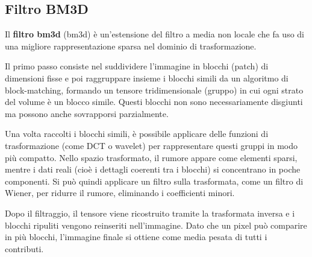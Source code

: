 \documentclass[../main.tex]{subfiles}
\begin{document}
\subsection{Filtro BM3D}

Il \textbf{filtro \acrshort{bm3d}} (\acrlong{bm3d}) è un'estensione del filtro a media non locale che fa uso di una migliore rappresentazione sparsa nel dominio di trasformazione\cite{manjon_2008}.

Il primo passo consiste nel suddividere l'immagine in blocchi (patch) di dimensioni fisse e poi raggruppare insieme i blocchi simili da un algoritmo di block-matching, formando un tensore tridimensionale (gruppo) in cui ogni strato del volume è un blocco simile. Questi blocchi non sono necessariamente disgiunti ma possono anche sovrapporsi parzialmente.

Una volta raccolti i blocchi simili, è possibile applicare delle funzioni di trasformazione (come DCT o wavelet) per rappresentare questi gruppi in modo più compatto. Nello spazio trasformato, il rumore appare come elementi sparsi, mentre i dati reali (cioè i dettagli coerenti tra i blocchi) si concentrano in poche componenti. Si può quindi applicare un filtro sulla trasformata, come un filtro di Wiener, per ridurre il rumore, eliminando i coefficienti minori.\cite{maggioni_2013}

Dopo il filtraggio, il tensore viene ricostruito tramite la trasformata inversa e i blocchi ripuliti vengono reinseriti nell'immagine. Dato che un pixel può comparire in più blocchi, l'immagine finale si ottiene come media pesata di tutti i contributi.\cite{dabov_2007}
\end{document}

